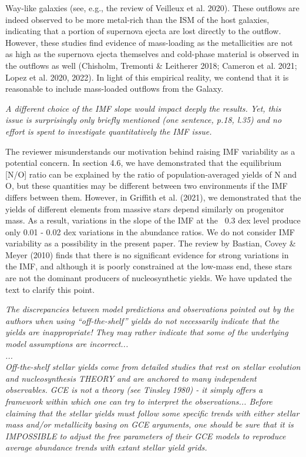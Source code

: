 \documentclass[12pt]{article}
\newcommand\doublebreak[0]{\par\null\par\noindent}
\begin{document}
Way-like galaxies (see, e.g., the review of Veilleux et al. 2020).
These outflows are indeed observed to be more metal-rich than the ISM of the
host galaxies, indicating that a portion of supernova ejecta are lost directly
to the outflow.
However, these studies find evidence of mass-loading as the metallicities are
not as high as the supernova ejecta themselves and cold-phase material is
observed in the outflows as well (Chisholm, Tremonti \& Leitherer 2018;
Cameron et al. 2021; Lopez et al. 2020, 2022).
In light of this empirical reality, we contend that it is reasonable to include
mass-loaded outflows from the Galaxy.
\doublebreak
\textit{%
A different choice of the IMF slope would impact deeply the results.
Yet, this issue is surprisingly only briefly mentioned (one sentence, p.18,
l.35) and no effort is spent to investigate quantitatively the IMF issue.
}
\doublebreak
The reviewer misunderstands our motivation behind raising IMF variability as a
potential concern.
In section 4.6, we have demonstrated that the equilibrium [N/O] ratio can be
explained by the ratio of population-averaged yields of N and O, but these
quantities may be different between two environments if the IMF differs between
them.
However, in Griffith et al. (2021), we demonstrated that the yields of
different elements from massive stars depend similarly on progenitor mass.
As a result, variations in the slope of the IMF at the ~0.3 dex level produce
only 0.01 - 0.02 dex variations in the abundance ratios.
We do not consider IMF variability as a possibility in the present paper.
The review by Bastian, Covey \& Meyer (2010) finds that there is no significant
evidence for strong variations in the IMF, and although it is poorly
constrained at the low-mass end, these stars are not the dominant producers of
nucleosynthetic yields.
{\color{red} We have updated the text to clarify this point.}
\doublebreak
\textit{%
The discrepancies between model predictions and observations pointed out by the
authors when using ``off-the-shelf'' yields do not necessarily indicate that
the yields are inappropriate!
They may rather indicate that some of the underlying model assumptions are
incorrect...
\\
...
\\
Off-the-shelf stellar yields come from detailed studies that rest on stellar
evolution and nucleosynthesis THEORY and are anchored to many independent
observables.
GCE is not a theory (see Tinsley 1980) - it simply offers a framework within
which one can try to interpret the observations...
Before claiming that the stellar yields must follow some specific trends with
either stellar mass and/or metallicity basing on GCE arguments, one should be
sure that it is IMPOSSIBLE to adjust the free parameters of their GCE models to
reproduce average abundance trends with extant stellar yield grids.
}
\end{document}
